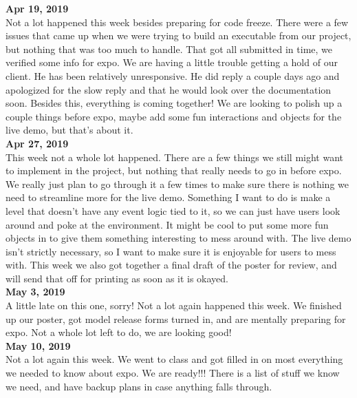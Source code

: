 \textbf{Apr 19, 2019}\\
Not a lot happened this week besides preparing for code freeze. There were a few issues that came up when we were trying to build an executable from our project, but nothing that was too much to handle. That got all submitted in time, we verified some info for expo.
We are having a little trouble getting a hold of our client. He has been relatively unresponsive. He did reply a couple days ago and apologized for the slow reply and that he would look over the documentation soon. Besides this, everything is coming together! We are looking to polish up a couple things before expo, maybe add some fun interactions and objects for the live demo, but that’s about it.\\

\textbf{Apr 27, 2019}\\
This week not a whole lot happened. There are a few things we still might want to implement in the project, but nothing that really needs to go in before expo. We really just plan to go through it a few times to make sure there is nothing we need to streamline more for the live demo.
Something I want to do is make a level that doesn't have any event logic tied to it, so we can just have users look around and poke at the environment. It might be cool to put some more fun objects in to give them something interesting to mess around with. The live demo isn't strictly necessary, so I want to make sure it is enjoyable for users to mess with.
This week we also got together a final draft of the poster for review, and will send that off for printing as soon as it is okayed.\\

\textbf{May 3, 2019}\\
A little late on this one, sorry! Not a lot again happened this week. We finished up our poster, got model release forms turned in, and are mentally preparing for expo. Not a whole lot left to do, we are looking good!\\

\textbf{May 10, 2019}\\
Not a lot again this week. We went to class and got filled in on most everything we needed to know about expo. We are ready!!! There is a list of stuff we know we need, and have backup plans in case anything falls through. \\

